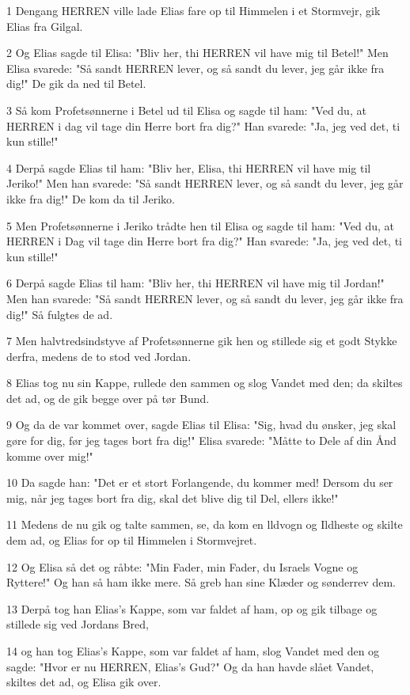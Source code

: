 \par 1 Dengang HERREN ville lade Elias fare op til Himmelen i et Stormvejr, gik Elias fra Gilgal.
\par 2 Og Elias sagde til Elisa: "Bliv her, thi HERREN vil have mig til Betel!" Men Elisa svarede: "Så sandt HERREN lever, og så sandt du lever, jeg går ikke fra dig!" De gik da ned til Betel.
\par 3 Så kom Profetsønnerne i Betel ud til Elisa og sagde til ham: "Ved du, at HERREN i dag vil tage din Herre bort fra dig?" Han svarede: "Ja, jeg ved det, ti kun stille!"
\par 4 Derpå sagde Elias til ham: "Bliv her, Elisa, thi HERREN vil have mig til Jeriko!" Men han svarede: "Så sandt HERREN lever, og så sandt du lever, jeg går ikke fra dig!" De kom da til Jeriko.
\par 5 Men Profetsønnerne i Jeriko trådte hen til Elisa og sagde til ham: "Ved du, at HERREN i Dag vil tage din Herre bort fra dig?" Han svarede: "Ja, jeg ved det, ti kun stille!"
\par 6 Derpå sagde Elias til ham: "Bliv her, thi HERREN vil have mig til Jordan!" Men han svarede: "Så sandt HERREN lever, og så sandt du lever, jeg går ikke fra dig!" Så fulgtes de ad.
\par 7 Men halvtredsindstyve af Profetsønnerne gik hen og stillede sig et godt Stykke derfra, medens de to stod ved Jordan.
\par 8 Elias tog nu sin Kappe, rullede den sammen og slog Vandet med den; da skiltes det ad, og de gik begge over på tør Bund.
\par 9 Og da de var kommet over, sagde Elias til Elisa: "Sig, hvad du ønsker, jeg skal gøre for dig, før jeg tages bort fra dig!" Elisa svarede: "Måtte to Dele af din Ånd komme over mig!"
\par 10 Da sagde han: "Det er et stort Forlangende, du kommer med! Dersom du ser mig, når jeg tages bort fra dig, skal det blive dig til Del, ellers ikke!"
\par 11 Medens de nu gik og talte sammen, se, da kom en lldvogn og Ildheste og skilte dem ad, og Elias for op til Himmelen i Stormvejret.
\par 12 Og Elisa så det og råbte: "Min Fader, min Fader, du Israels Vogne og Ryttere!" Og han så ham ikke mere. Så greb han sine Klæder og sønderrev dem.
\par 13 Derpå tog han Elias's Kappe, som var faldet af ham, op og gik tilbage og stillede sig ved Jordans Bred,
\par 14 og han tog Elias's Kappe, som var faldet af ham, slog Vandet med den og sagde: "Hvor er nu HERREN, Elias's Gud?" Og da han havde slået Vandet, skiltes det ad, og Elisa gik over.
